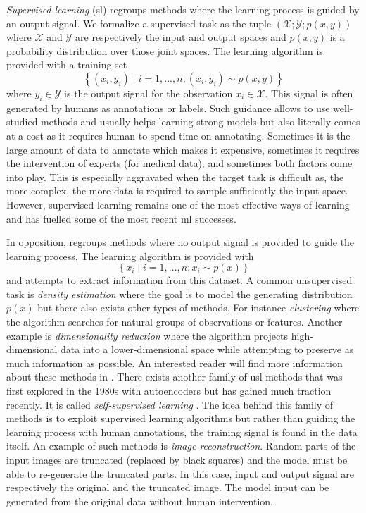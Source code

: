 \textit{Supervised learning} (\acrshort{sl}) regroups methods where the learning process is guided by an output signal. We formalize a supervised task as the tuple $\left(\mathcal{X}; \mathcal{Y}; p(x, y)\right)$ where $\mathcal{X}$ and $\mathcal{Y}$ are respectively the input and output spaces and $p(x, y)$ is a probability distribution over those joint spaces. The learning algorithm is provided with a training set 
\begin{equation}
\left\{(x_i, y_i) \mid i = 1,...,n ; (x_i, y_i) \sim p(x, y)\right\}
\end{equation}
where $y_i \in \mathcal{Y}$ is the output signal for the observation $x_i \in \mathcal{X}$.  This signal is often generated by humans as annotations or labels. Such guidance allows to use well-studied methods and usually helps learning strong models but also literally comes at a cost as it requires human to spend time on annotating. Sometimes it is the large amount of data to annotate which makes it expensive, sometimes it requires the intervention of experts (\eg for medical data), and sometimes both factors come into play. This is especially aggravated when the target task is difficult as, the more complex, the more data is required to sample sufficiently the input space. However, supervised learning remains one of the most effective ways of learning and has fuelled some of the most recent \acrlong{ml} successes.

In opposition,  regroups methods where no output signal is provided to guide the learning process. The learning algorithm is provided with 
\begin{equation}
\left\{x_i \mid i = 1,..., n ; x_i \sim p(x)\right\}
\end{equation} 
and attempts to extract information from this dataset. A common unsupervised task is \textit{density estimation} where the goal is to model the generating distribution $p(x)$ but there also exists other types of methods. For instance \textit{clustering} where the algorithm searches for natural groups of observations or features. Another example is \textit{dimensionality reduction} where the algorithm projects high-dimensional data into a lower-dimensional space while attempting to preserve as much information as possible. An interested reader will find more information about these methods in \parencite{friedman2017elements}. There exists another family of \acrlong{usl} methods that was first explored in the 1980s with autoencoders but has gained much traction recently. It is called \textit{self-supervised learning} \parencite{lecun2021self}. The idea behind this family of methods is to exploit supervised learning algorithms but rather than guiding the learning process with human annotations, the training signal is found in the data itself. An example of such methods is \textit{image reconstruction}. Random parts of the input images are truncated (\eg replaced by black squares) and the model must be able to re-generate the truncated parts. In this case, input and output signal are respectively the original and the truncated image. The model input can be generated from the original data without human intervention. 

